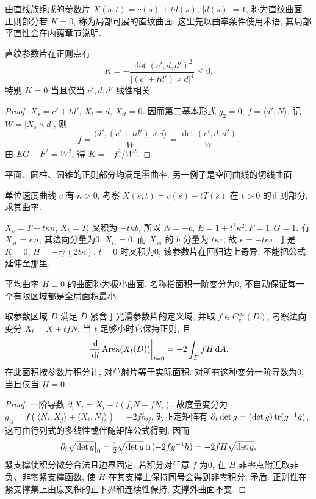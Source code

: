 \begin{definition}
由直线族组成的参数片 $X(s,t)=c(s)+td(s)$, $|d(s)|=1$, 称为直纹曲面. 正则部分若 $K=0$, 称为局部可展的直纹曲面; 这里先以曲率条件使用术语, 其局部平直性会在内蕴章节说明.
\end{definition}
\begin{proposition}\label{prop:ruled}
直纹参数片在正则点有
\[
 K=-\frac{\det(c',d,d')^2}{|(c'+td')\times d|^4}\le0.
\]
特别 $K=0$ 当且仅当 $c',d,d'$ 线性相关.
\end{proposition}
\begin{proof}
$X_s=c'+td'$, $X_t=d$, $X_{tt}=0$. 因而第二基本形式 $g_2=0$, $f=\langle d',N\rangle$. 记 $W=|X_s\times d|$, 则
\[
 f=\frac{\langle d',(c'+td')\times d\rangle}{W}
   =\frac{\det(c',d,d')}{W}.
\]
由 $EG-F^2=W^2$, 得 $K=-f^2/W^2$.
\end{proof}
平面、圆柱、圆锥的正则部分均满足零曲率. 另一例子是空间曲线的切线曲面.
\begin{example}
单位速度曲线 $c$ 有 $\kappa>0$, 考察 $X(s,t)=c(s)+tT(s)$ 在 $t>0$ 的正则部分, 求其曲率.
\end{example}
\begin{solution}
$X_s=T+t\kappa n$, $X_t=T$, 叉积为 $-t\kappa b$, 所以 $N=-b$, $E=1+t^2\kappa^2,F=1,G=1$. 有 $X_{st}=\kappa n$, 其法向分量为0, $X_{tt}=0$, 而 $X_{ss}$ 的 $b$ 分量为 $t\kappa\tau$, 故 $e=-t\kappa\tau$. 于是 $K=0$, $H=-\tau/(2t\kappa)$. $t=0$ 时叉积为0, 该参数片在回归边上奇异, 不能把公式延伸至那里.
\end{solution}
\begin{definition}
平均曲率 $H\equiv0$ 的曲面称为极小曲面. 名称指面积一阶变分为0, 不自动保证每一个有限区域都是全局面积最小.
\end{definition}
\begin{theorem}\label{thm:first-area}
取参数区域 $D$ 满足 $\overline D$ 紧含于光滑参数片的定义域, 并取 $f\in C_c^\infty(D)$, 考察法向变分 $X_t=X+t fN$. 当 $t$ 足够小时它保持正则, 且
\[
 \left.\frac{\,\mathrm d}{\,\mathrm d t}\operatorname{Area}(X_t(D))\right|_{t=0}
 =-2\int_D fH\,\mathrm d A.
\]
在此面积按参数片积分计, 对单射片等于实际面积. 对所有这种变分一阶导数为0, 当且仅当 $H=0$.
\end{theorem}
\begin{proof}
一阶导数 $\partial_iX_t=X_i+t(f_iN+fN_i)$. 故度量变分为 $\dot g_{ij}=f(\langle N_i,X_j\rangle+\langle X_i,N_j\rangle)=-2fh_{ij}$. 对正定矩阵有 $\partial_t\det g=(\det g)\operatorname{tr}(g^{-1}\dot g)$, 这可由行列式的多线性或伴随矩阵公式得到. 因而
\[
 \partial_t\sqrt{\det g}\big|_0
 =\tfrac12\sqrt{\det g}\operatorname{tr}(-2fg^{-1}h)=-2fH\sqrt{\det g}.
\]
紧支撑使积分微分合法且边界固定. 若积分对任意 $f$ 为0, 在 $H$ 非零点附近取非负、非零紧支撑函数, 使 $H$ 在其支撑上保持同号会得到非零积分, 矛盾. 正则性在紧支撑集上由原叉积的正下界和连续性保持, 支撑外曲面不变.
\end{proof}
